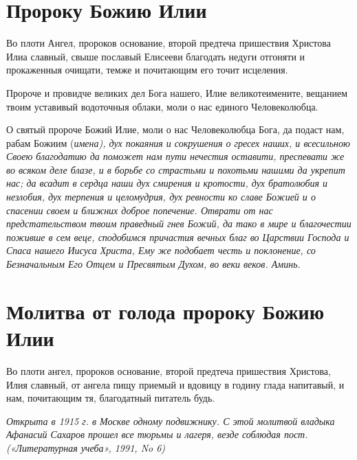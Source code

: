 
 

\section{Пророку Божию Илии}
 



Во плоти Ангел, пророков основание, второй предтеча пришествия Христова Илиа славный, свыше пославый Елисееви благодать недуги отгоняти и прокаженныя очищати, темже и почитающим его точит исцеления.




Пророче и провидче великих дел Бога нашего, Илие великотеимените, вещанием твоим уставивый водоточныя облаки, моли о нас единого Человеколюбца.




О святый пророче Божий Илие, моли о нас Человеколюбца Бога, да подаст нам, рабам Божиим (\itshape имена\normalfont{}), дух покаяния и сокрушения о гресех наших, и всесильною Своею благодатию да поможет нам пути нечестия оставити, преспевати же во всяком деле блазе, и в борьбе со страстьми и похотьми нашими да укрепит нас; да всадит в сердца наши дух смирения и кротости, дух братолюбия и незлобия, дух терпения и целомудрия, дух ревности ко славе Божией и о спасении своем и ближних доброе попечение. Отврати от нас предстательством твоим праведный гнев Божий, да тако в мире и благочестии поживше в сем веце, сподобимся причастия вечных благ во Царствии Господа и Спаса нашего Иисуса Христа, Ему же подобает честь и поклонение, со Безначальным Его Отцем и Пресвятым Духом, во веки веков. Аминь.


\section{Молитва от голода пророку Божию Илии}
 



Во плоти ангел, пророков основание, второй предтеча пришествия Христова, Илия славный, от ангела пищу приемый и вдовицу в годину глада напитавый, и нам, почитающим тя, благодатный питатель будь.


\itshape Открыта в 1915 г. в Москве одному подвижнику. С этой молитвой владыка Афанасий Сахаров прошел все тюрьмы и лагеря, везде соблюдая пост. («Литературная учеба», 1991, No 6)\normalfont{}
\longpage[2]\mychapterending

